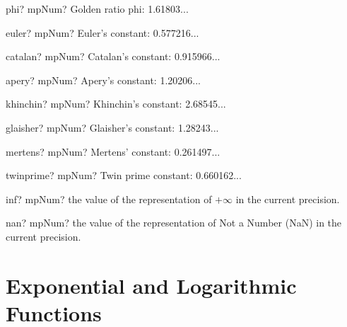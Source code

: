 \documentclass[12pt,a4paper,openany]{book}
\begin{document}
\begin{mpFunctionsExtract}
\mpFunctionZero
{phi? mpNum?  Golden ratio phi: 1.61803...}
\end{mpFunctionsExtract}

\begin{mpFunctionsExtract}
\mpFunctionZero
{euler? mpNum?  Euler's constant: 0.577216...}
\end{mpFunctionsExtract}

\begin{mpFunctionsExtract}
\mpFunctionZero
{catalan? mpNum?  Catalan's constant: 0.915966...}
\end{mpFunctionsExtract}

\begin{mpFunctionsExtract}
\mpFunctionZero
{apery? mpNum?  Apery's constant: 1.20206...}
\end{mpFunctionsExtract}

\begin{mpFunctionsExtract}
\mpFunctionZero
{khinchin? mpNum?  Khinchin's constant: 2.68545...}
\end{mpFunctionsExtract}

\begin{mpFunctionsExtract}
\mpFunctionZero
{glaisher? mpNum?  Glaisher's constant: 1.28243...}
\end{mpFunctionsExtract}

\begin{mpFunctionsExtract}
\mpFunctionZero
{mertens? mpNum?  Mertens' constant: 0.261497...}
\end{mpFunctionsExtract}

\begin{mpFunctionsExtract}
\mpFunctionZero
{twinprime? mpNum?  Twin prime constant: 0.660162...}
\end{mpFunctionsExtract}

\begin{mpFunctionsExtract}
\mpFunctionZero
{inf? mpNum? the value of the representation of  $+\infty$ in the current precision.}
\end{mpFunctionsExtract}

\begin{mpFunctionsExtract}
\mpFunctionZero
{nan? mpNum? the value of the representation of Not a Number (NaN) in the current precision.}
\end{mpFunctionsExtract}

\section{Exponential and Logarithmic Functions}
\end{document}
